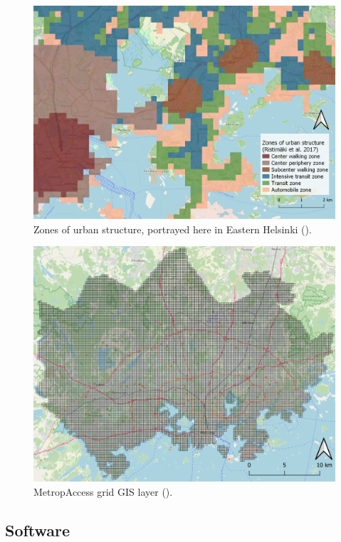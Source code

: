 \begin{figure}[H]%
    \centering
    \includegraphics[width=.88\textwidth]{images/thesis_data_ykr_zones.png}
    \caption[Zones of urban structure in Eastern Helsinki.]{Zones of urban structure, portrayed here in Eastern Helsinki (\cite{OpenStreetMap}).}%
    \label{fig:datalayers_ykr}%
\end{figure} 

\begin{figure}[H]%
    \includegraphics[width=\textwidth]{images/thesis_data_grid.png}
    \caption[MetropAccess grid]{MetropAccess grid GIS layer (\cite{OpenStreetMap}).}%
    \label{fig:datalayers_metropaccess_ykr}%
\end{figure}

\subsection{Software}
\justify

